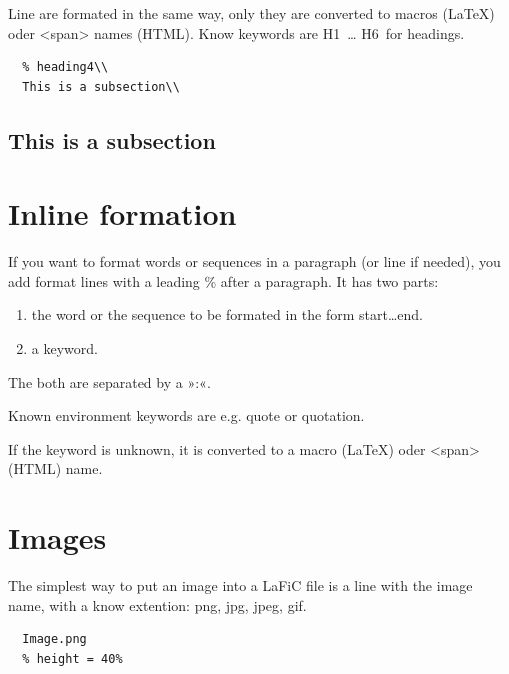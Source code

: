 \documentclass{article}
\begin{document}
Line are formated in the same way, only they are converted
to macros (LaTeX) oder <span> names (HTML). Know keywords
are H1~… H6~for headings.

\begin{verbatim}
  % heading4\\
  This is a subsection\\

\end{verbatim}

\subsection{This is a subsection}

\section{Inline formation}

If you want to format words or sequences in a paragraph (or
line if needed), you add format lines with a leading \% after
a paragraph. It has two parts:

\begin{enumerate}

\item the word or the sequence to be formated in the form
  start…end. 
\item a keyword.

\end{enumerate}

The both are separated by a »:«.

Known environment keywords are e.g. quote or quotation.

If the keyword is unknown, it is converted to a macro
(LaTeX) oder <span> (HTML) name.

\section{Images}

The simplest way to put an image into a LaFiC file is a
line with the image name, with a know extention: png, jpg,
jpeg, gif.

\begin{verbatim}
  Image.png
  % height = 40%

\end{verbatim}
\end{document}
